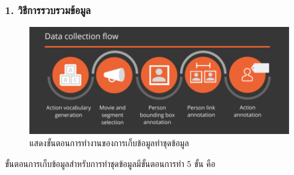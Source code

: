\subsubsection*{1. วิธีการรวบรวมข้อมูล}
\begin{figure}[!ht]
	\centering
	\includegraphics[width=1\textwidth]{chapter2/images/data_collection_ava.png}
		\caption{แสดงขั้นตอนการทำงานของการเก็บข้อมูลทำชุดข้อมูล}
    	\label{fig:data_collection_ava}
\end{figure}
ขั้นตอนการเก็บข้อมูลสำหรับการทำชุดข้อมูลมีขั้นตอนการทำ 5 ขั้น คือ
